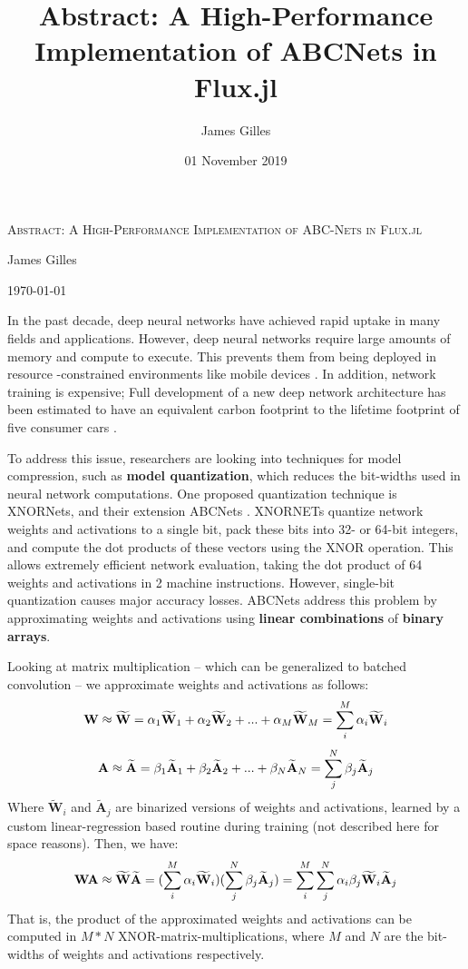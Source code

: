 \documentclass[11pt]{article}
\author{James Gilles}
\date{01 November 2019}
\title{Abstract: A High-Performance Implementation of ABCNets in Flux.jl}
\newcommand*{\Wv}[0]{\mathbf{W}}
\newcommand*{\Av}[0]{\mathbf{A}}
\newcommand*{\Wa}[0]{\widetilde{\mathbf{W}}}
\newcommand*{\Aa}[0]{\widetilde{\mathbf{A}}}
\newcommand*{\approxident}{%
\mathrel{\vcenter{\offinterlineskip
\hbox{$\sim$}\vskip-.35ex\hbox{$\sim$}}}}
\renewcommand*{\maketitle}[0]{}
\renewcommand*{\tableofcontents}[0]{}
\begin{document}
\maketitle
\tableofcontents

\textsc{Abstract: A High-Performance Implementation of ABC-Nets in Flux.jl}

James Gilles

\today

In the past decade, deep neural networks have achieved rapid uptake in many fields
and applications. However, deep neural networks require large amounts
of memory and compute to execute. This prevents them from being deployed in resource
-constrained environments like mobile devices \citep{MobileNets}. In addition,
network training is expensive; Full
development of a new deep network architecture has been estimated to have an equivalent
carbon footprint to the lifetime footprint of five consumer cars \citep{EmitCarbon}.

To address this issue, researchers are looking into techniques for model compression,
such as \textbf{model quantization}, which reduces the bit-widths used in neural network
computations. One proposed quantization
technique is XNORNets, and their extension ABCNets \citep{XNORNets}\citep{ABCNets}.
XNORNETs quantize network weights and activations to a single
bit, pack these bits into 32- or 64-bit integers, and compute the dot products of
these vectors using the XNOR operation. This allows extremely efficient network
evaluation, taking the dot product of 64 weights and activations in 2
machine instructions. However, single-bit quantization causes major accuracy losses.
ABCNets address this problem by approximating weights and
activations using \textbf{linear combinations} of \textbf{binary arrays}.

Looking at matrix multiplication -- which can be generalized to batched convolution --
we approximate weights and activations as follows:
$$\Wv \approxident \Wa = \alpha_1 \Wa_1 + \alpha_2 \Wa_2 + ... + \alpha_M \Wa_M = \sum_i^M \alpha_i \Wa_i$$
$$\Av \approxident \Aa = \beta_1 \Aa_1 + \beta_2 \Aa_2 + ... + \beta_N \Aa_N = \sum_j^N \beta_j \Aa_j $$
Where \(\Wa_i\) and \(\Aa_j\) are binarized versions of weights and activations, learned by a
custom linear-regression based routine during training (not described here for space
reasons).
Then, we have:
$$\Wv\Av \approxident \Wa\Aa = (\sum_i^M \alpha_i \Wa_i) (\sum_j^N \beta_j \Aa_j) \\
                            = \sum_i^M \sum_j^N \alpha_i \beta_j \Wa_i \Aa_j$$
That is, the product of the approximated weights and activations can be
computed in \(M*N\) XNOR-matrix-multiplications, where \(M\) and \(N\) are the bit-widths of
weights and activations respectively.
\end{document}
